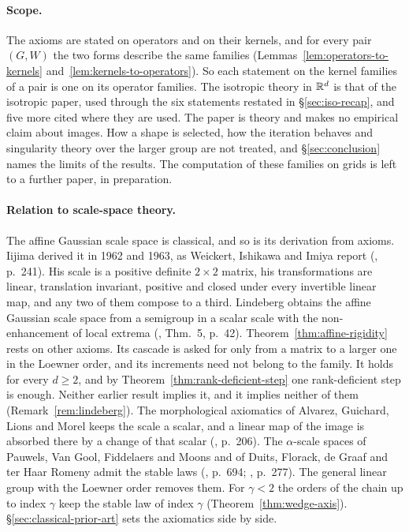 \paragraph{Scope.} The axioms are stated on operators and on their kernels, and for every pair
$(G, W)$ the two forms describe the same families (Lemmas~\ref{lem:operators-to-kernels}
and~\ref{lem:kernels-to-operators}). So each statement on the kernel families of a pair is one on its
operator families. The isotropic theory in $\mathbb{R}^d$ is that of the isotropic paper, used through the
six statements restated in \S\ref{sec:iso-recap}, and five more cited where they are used. The paper is theory and makes no empirical claim
about images. How a shape is selected, how the iteration behaves and singularity theory over the
larger group are not treated, and \S\ref{sec:conclusion} names the limits of the results. The
computation of these families on grids is left to a further paper, in preparation.

\paragraph{Relation to scale-space theory.} The affine Gaussian scale space is classical, and so is
its derivation from axioms. Iijima derived it in 1962 and 1963, as Weickert, Ishikawa and Imiya
report (, p.~241). His scale is a positive definite $2 \times 2$ matrix,
his transformations are linear, translation invariant, positive and closed under every invertible
linear map, and any two of them compose to a third. Lindeberg obtains the affine Gaussian scale space from a semigroup in a scalar scale with the
non-enhancement of local extrema (, Thm.~5, p.~42).
Theorem~\ref{thm:affine-rigidity} rests on other axioms. Its cascade is asked for only from a matrix to
a larger one in the Loewner order, and its increments need not belong to the family. It holds for every
$d \ge 2$, and by Theorem~\ref{thm:rank-deficient-step} one rank-deficient step is enough. Neither
earlier result implies it, and it implies neither of them (Remark~\ref{rem:lindeberg}). The morphological axiomatics of Alvarez, Guichard, Lions and Morel keeps
the scale a scalar, and a linear map of the image is absorbed there by a change of that scalar
(, p.~206). The $\alpha$-scale spaces of Pauwels, Van Gool, Fiddelaers and
Moons and of Duits, Florack, de Graaf and ter Haar Romeny admit the stable laws
(, p.~694; , p.~277). The general linear group with
the Loewner order removes them. For $\gamma < 2$ the orders of the chain up to index $\gamma$ keep the
stable law of index $\gamma$ (Theorem~\ref{thm:wedge-axis}). \S\ref{sec:classical-prior-art} sets the
axiomatics side by side.

